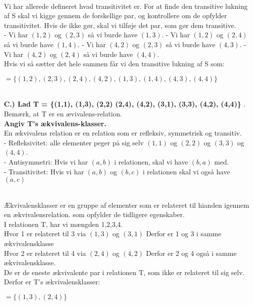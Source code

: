 \documentclass{article}
\begin{document}
\\
Vi har allerede defineret hvad transitivitet er. For at finde den transitive lukning af S skal vi kigge gennem de forskellige par, og kontrollere om de opfylder transitivitet. Hvis de ikke gør, skal vi tilføje det par, som gør dem transitive.
\\
- Vi har \((1, 2)\) og \((2, 3)\) så vi burde have \((1, 3)\).
- Vi har \((1, 2)\) og \((2, 4)\) så vi burde have \((1, 4)\).
- Vi har \((4, 2)\) og \((2, 3)\) så vi burde have \((4, 3)\).
- Vi har \((4, 2)\) og \((2, 4)\) så vi burde have \((4, 4)\).
\\
Hvis vi så sætter det hele sammen får vi den transitive lukning af S som: \\
\begin{center}
\(= \{(1, 2), (2, 3), (2, 4), (4, 2), (1, 3), (1, 4), (4, 3), (4, 4)\}\)
\end{center}
\\



\textbf{C.) Lad T = \{(1,1), (1,3), (2,2) (2,4), (4,2), (3,1), (3,3), (4,2), (4,4)\}} .
\\
Bemærk, at T er en ævivalens-relation. 
\\
\textbf{Angiv T's ækvivalens-klasser.}
\\ 
En ækvivalens relation er en relation som er refleksiv, symmetrisk og transitiv. \\

- Refleksivitet: alle elementer peger på sig selv \((1,1)\) og \((2,2)\) og \((3,3)\) og \((4,4)\). \\
- Antisymmetri: Hvis vi har \((a, b)\) i relationen, skal vi have \((b, a)\) med. \\
- Transitivitet: Hvis vi har \((a, b)\) og \((b, c)\) i relationen skal vi også have \((a, c)\) 

\\ 
Ækvivalensklasser er en gruppe af elementer som er relateret til hianden igennem en ækvivalensrelation. som opfylder de tidligere egenskaber.
\\
I relationen T, har vi mængden {1,2,3,4}.\\
Hvor 1 er relateret til 3 via \((1,3)\) og \((3,1)\) 
Derfor er 1 og 3 i samme ækvivalensklasse\\
Hvor 2 er relateret til 4 via \((2,4)\) og \((4,2)\) 
Derfor er 2 og 4 også i samme ækvivalensklasse. 
\\
De er de eneste ækvivalente par i relationen T, som ikke er relateret til sig selv.\\
Derfor er T's ækvivalensklasser:
\begin{center}
    \(= \{(1, 3), (2, 4)\}\)
\end{center}
\\
\\
\end{document}
